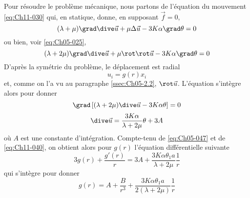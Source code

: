 Pour résoudre le problème mécanique, nous partons de l'équation du mouvement \eqref{eq:Ch11-030} qui, en statique, donne, en supposant $\vec{f}=0$, 
\begin{equation}
    (\lambda+\mu) \grad \dive \vec{u} + \mu \Delta \vec{u} - 3K\alpha \grad \theta = 0
\end{equation}
ou bien, voir \eqref{eq:Ch05-025}, 
\begin{equation}
    (\lambda+2\mu) \grad \dive \vec{u} + \mu \rot \rot \vec{u} - 3K\alpha \grad \theta = 0
    \label{eq:Ch11-041}
\end{equation}
D'après la symétrie du problème, le déplacement est radial 
\begin{equation}
    u_i=g(r) x_i
    \label{eq:Ch11-042}
\end{equation}
et, comme on l'a vu au paragraphe \ref{ssec:Ch05-2.2}, $\rot \vec{u}$. L'équation s'intègre alors pour donner 
\begin{equation} 
\grad\left[(\lambda + 2 \mu) \dive \vec{u} - 3 K \alpha \theta \right] = 0
\end{equation}
\begin{equation}
    \dive \vec{u} = \frac{3K\alpha}{\lambda + 2 \mu} \theta + 3 A
    \label{eq:Ch11-043}
\end{equation}
où $A$ est une constante d'intégration. Compte-tenu de \eqref{eq:Ch05-047} et de \eqref{eq:Ch11-040}, on obtient alors pour $g(r)$ l'équation différentielle suivante 
\begin{equation}
    3g(r)+\frac{g'(r)}{r} = 3A + \frac{3K\alpha\theta_1 a}{\lambda + 2 \mu}\frac{1}{r}
    \label{eq:Ch11-044}
\end{equation}
qui s'intègre pour donner 
\begin{equation}
    g(r) = A + \frac{B}{r^3}+\frac{3K\alpha\theta_1 a}{2(\lambda + 2\mu)}\frac{1}{r}
    \label{eq:Ch11-045}
\end{equation}

